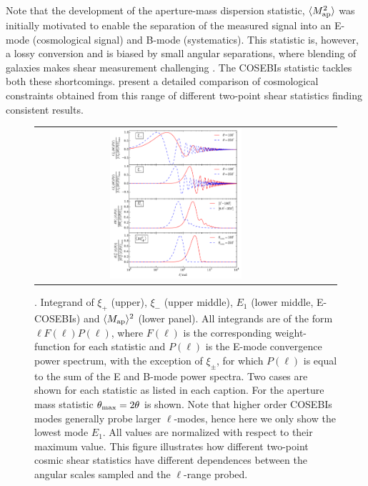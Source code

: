 Note that the development of the aperture-mass dispersion statistic, $\langle
M_ {\rm ap}^2 \rangle$ was initially motivated to enable the separation of the measured signal into an 
E-mode (cosmological signal) and B-mode (systematics). This statistic is, however, a lossy conversion and is
biased by small angular separations, where blending of galaxies makes shear
measurement challenging \citep{KSE06}. The COSEBIs statistic tackles both
these shortcomings.  \citet{CFHTLenS-2pt-notomo} present a detailed comparison of cosmological
constraints obtained from this range of different two-point shear statistics finding consistent results.

\begin{figure}%
\begin{center}
\begin{tabular}{ccc}
\includegraphics[width=0.48\textwidth]{figures/IntegAll.pdf} \\
\end{tabular}
\caption{ \small{\label{fig:filters}. 
Integrand of $\xi_+$ (upper), $\xi_-$
(upper middle), $E_1$ (lower middle, E-COSEBIs) and $\langle M_{\rm ap}
\rangle^2$ (lower panel). All integrands are of the form $\ell F(\ell)
P(\ell)$, where $F(\ell)$ is the corresponding weight-function for each
statistic and $P(\ell)$ is the E-mode convergence power spectrum, with the
exception of $\xi_\pm$, for which $P(\ell)$ is equal to the sum of the E and
B-mode power spectra. Two cases are shown for each statistic as listed in each
caption. For the aperture mass statistic $\theta_{\rm max}=2\theta$ is shown.
Note that higher order COSEBIs modes generally probe larger $\ell$-modes, hence
here we only show the lowest mode $E_1$. All values are normalized with respect
to their maximum value. This figure illustrates how different two-point cosmic shear
statistics have different dependences between the angular scales sampled and the $\ell$-range probed. }}
\end{center}
\end{figure}

